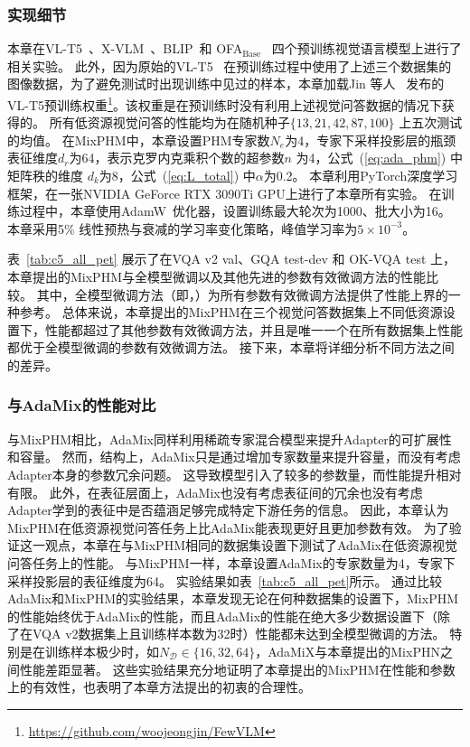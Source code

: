 \subsubsection{实现细节}
本章在VL-T5~\cite{cho2021unifying}、X-VLM~\cite{zeng2022multi}、BLIP~\cite{li2022blip}和 OFA$_{\text{Base}}$~\cite{wang2022ofa} 四个预训练视觉语言模型上进行了相关实验。
此外，因为原始的VL-T5~\cite{cho2021unifying} 在预训练过程中使用了上述三个数据集的图像数据，为了避免测试时出现训练中见过的样本，本章加载Jin 等人~\cite{jin2022good} 发布的VL-T5预训练权重\footnote[2]{\href{https://github.com/woojeongjin/FewVLM}{https://github.com/woojeongjin/FewVLM}}。该权重是在预训练时没有利用上述视觉问答数据的情况下获得的。
所有低资源视觉问答的性能均为在随机种子$\{13, 21, 42, 87, 100\}$ 上五次测试的均值。
在MixPHM中，本章设置PHM专家数$N_e$为4，专家下采样投影层的瓶颈表征维度$d_r$为64，表示克罗内克乘积个数的超参数$n$ 为4，公式~(\ref{eq:ada_phm}) 中矩阵秩的维度 $d_k$为8，公式~(\ref{eq:L_total}) 中$\alpha$为0.2。
本章利用PyTorch深度学习框架，在一张NVIDIA GeForce RTX 3090Ti GPU上进行了本章所有实验。
在训练过程中，本章使用AdamW~\cite{loshchilov2017decoupled}优化器，设置训练最大轮次为1000、批大小为16。
本章采用5\% 线性预热与衰减的学习率变化策略，峰值学习率为$5\times 10^{-3}$。






表~\ref{tab:c5_all_pet} 展示了在VQA v2 val、GQA test-dev 和 OK-VQA test 上，本章提出的MixPHM与全模型微调以及其他先进的参数有效微调方法的性能比较。
其中，全模型微调方法（即，）为所有参数有效微调方法提供了性能上界的一种参考。
总体来说，本章提出的MixPHM在三个视觉问答数据集上不同低资源设置下，性能都超过了其他参数有效微调方法，并且是唯一一个在所有数据集上性能都优于全模型微调的参数有效微调方法。
接下来，本章将详细分析不同方法之间的差异。

\subsubsection{与AdaMix的性能对比}
与MixPHM相比，AdaMix同样利用稀疏专家混合模型来提升Adapter的可扩展性和容量。
然而，结构上，AdaMix只是通过增加专家数量来提升容量，而没有考虑Adapter本身的参数冗余问题。
这导致模型引入了较多的参数量，而性能提升相对有限。
此外，在表征层面上，AdaMix也没有考虑表征间的冗余也没有考虑Adapter学到的表征中是否蕴涵足够完成特定下游任务的信息。
因此，本章认为MixPHM在低资源视觉问答任务上比AdaMix能表现更好且更加参数有效。
为了验证这一观点，本章在与MixPHM相同的数据集设置下测试了AdaMix在低资源视觉问答任务上的性能。
与MixPHM一样，本章设置AdaMix的专家数量为4，专家下采样投影层的表征维度为64。
实验结果如表~\ref{tab:c5_all_pet}所示。
通过比较AdaMix和MixPHM的实验结果，本章发现无论在何种数据集的设置下，MixPHM的性能始终优于AdaMix的性能，而且AdaMix的性能在绝大多少数据设置下（除了在VQA v2数据集上且训练样本数为32时）性能都未达到全模型微调的方法。
特别是在训练样本极少时，如$N_{\mathcal{D}} \in \{16, 32, 64\}$，AdaMiX与本章提出的MixPHN之间性能差距显著。
这些实验结果充分地证明了本章提出的MixPHM在性能和参数上的有效性，也表明了本章方法提出的初衷的合理性。


